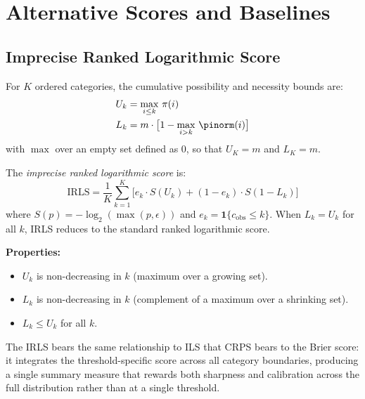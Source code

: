 
\appendix
\section{Alternative Scores and Baselines}\label{sec:appendix_alt}

\subsection{Imprecise Ranked Logarithmic Score}\label{sec:irls}

For $K$ ordered categories, the cumulative possibility and necessity
bounds are:
\begin{align}
U_k &= \max_{i \leq k}\, \pi(i) \\
L_k &= m \cdot \bigl[1 - \max_{i > k}\, \pinorm(i)\bigr]
\end{align}
with $\max$ over an empty set defined as $0$, so that $U_K = m$ and
$L_K = m$.

The \textit{imprecise ranked logarithmic score} is:
\begin{equation}
\mathrm{IRLS} = \frac{1}{K} \sum_{k=1}^{K}
    \bigl[e_k \cdot S(U_k) + (1 - e_k) \cdot S(1 - L_k)\bigr]
\label{eq:irls}
\end{equation}
where $S(p) = -\log_2(\max(p, \epsilon))$ and
$e_k = \mathbf{1}\{c_{\mathrm{obs}} \leq k\}$. When $L_k = U_k$ for
all $k$, IRLS reduces to the standard ranked logarithmic score.

\textbf{Properties:}
\begin{itemize}[leftmargin=2em]
\item $U_k$ is non-decreasing in $k$ (maximum over a growing set).
\item $L_k$ is non-decreasing in $k$ (complement of a maximum over a
    shrinking set).
\item $L_k \leq U_k$ for all $k$.
\end{itemize}

The IRLS bears the same relationship to ILS that CRPS bears to the Brier score: it integrates the threshold-specific score across all category boundaries, producing a single summary measure that rewards both sharpness and calibration across the full distribution rather than at a single threshold.

